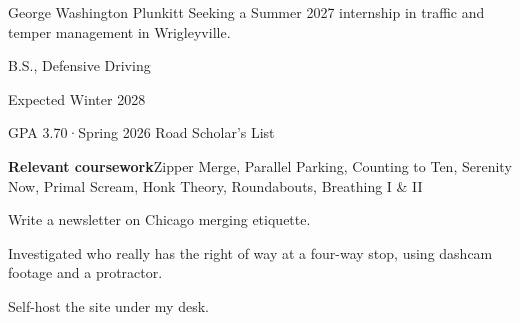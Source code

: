 \documentclass[palette=walnut]{mosaicresume}
\begin{document}
  {George Washington Plunkitt}
  {Seeking a Summer 2027 internship in traffic and temper management in Wrigleyville.}

\creditmosaic

\begin{threecolumns}
B.S., Defensive Driving\par
Expected Winter 2028\par
GPA 3.70\enspace·\enspace Spring 2026 Road Scholar's List\par
\vspace{3pt}
{\sffamily\bfseries Relevant coursework}\enspace Zipper Merge, Parallel
Parking, Counting to Ten, Serenity Now, Primal Scream, Honk Theory,
Roundabouts, Breathing I \& II\par
\sectiongap
{}
\sectiongap
{}
\begin{rbullets}
  \item Write a newsletter on Chicago merging etiquette.
  \item Investigated who really has the right of way at a four-way stop, using dashcam footage and a protractor.
  \item Self-host the site under my desk.
\end{rbullets}


\end{threecolumns}
\end{document}
